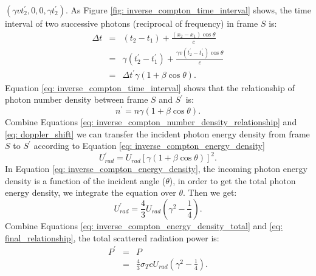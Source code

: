 \documentclass[a4paper, 12pt]{report}
\begin{document}
      $\left(\gamma v t_{2}^{\prime}, 0, 0, \gamma t_{2}^{\prime}\right)$. 
      As Figure \ref{fig: inverse_compton_time_interval} shows, the time interval of two 
      successive photons (reciprocal of frequency) in frame $S$ is: 
      \begin{eqnarray}
        \label{eq: inverse_compton_time_interval}
        \Delta t &=& \left(t_2 - t_1\right) + \frac{\left(x_2 - x_1\right) \cos{\theta}}{c}  \nonumber \\ 
                &=& \gamma \left(t_{2}^{\prime} - t_{1}^{\prime}\right) + \frac{\gamma v \left(t_{2}^{\prime} - t_{1}^{\prime}\right) \cos{\theta}}{c} \nonumber \\
                &=&  \Delta t^{\prime} \gamma \left(1 + \beta \cos{\theta}\right) .
      \end{eqnarray}
      Equation \ref{eq: inverse_compton_time_interval} shows that the relationship of photon 
      number density between frame $S$ and $S^{\prime}$ is:
      \begin{equation}
          \label{eq: inverse_compton_number_density_relationship}
          n^{\prime} = n \gamma \left(1 + \beta \cos{\theta}\right) .
      \end{equation}
      Combine Equations \ref{eq: inverse_compton_number_density_relationship} and 
      \ref{eq: doppler_shift} we can transfer the incident photon energy density from 
      frame $S$ to $S^{\prime}$ according to Equation \ref{eq: inverse_compton_energy_density}
      \begin{equation}
        \label{eq: inverse_compton_energy_density}
        U_{rad}^{\prime} = U_{rad} \left[\gamma \left(1 + \beta \cos{\theta}\right)\right]^{2} .
      \end{equation}
      In Equation \ref{eq: inverse_compton_energy_density}, the incoming photon energy density 
      is a function of the incident angle ($\theta$), in order to get the total photon 
      energy density, we integrate the equation over $\theta$. Then we get: 
      \begin{equation}
        \label{eq: inverse_compton_energy_density_total}
        U_{rad}^{\prime} = \frac{4}{3} U_{rad} \left(\gamma^2 - \frac{1}{4}\right) .
      \end{equation}
      Combine Equations \ref{eq: inverse_compton_energy_density_total} and 
      \ref{eq: final_relationship}, the total scattered radiation power is:
      \begin{eqnarray}
        \label{eq: inverse_compton_power}
        P^{\prime} &=& P  \nonumber \\
                  &=& \frac{4}{3} \sigma_{T} c U_{rad} \left(\gamma^2 - \frac{1}{4}\right) .
      \end{eqnarray}
\end{document}
